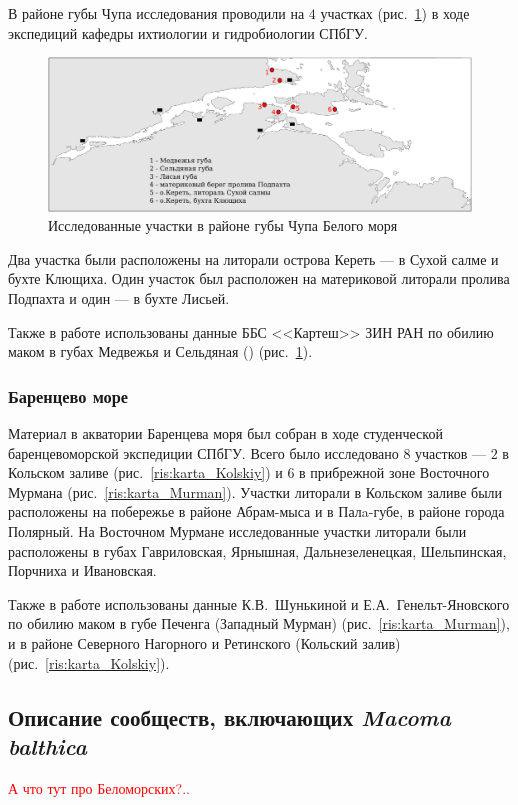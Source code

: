 В районе губы Чупа исследования проводили на $4$ участках (рис.~\ref{ris:karta_Chupa}) в ходе экспедиций кафедры ихтиологии и гидробиологии СПбГУ. 
\begin{figure}
    \includegraphics[width=\textwidth]{../maps/map_Chupa.pdf}
    \caption{Исследованные участки в районе губы Чупа Белого моря}
    \label{ris:karta_Chupa}
\end{figure}
Два участка были расположены на литорали острова Кереть --- в Сухой салме и бухте Клющиха. 
Один участок был расположен на материковой литорали пролива Подпахта и один --- в бухте Лисьей.

Также в работе использованы данные ББС <<Картеш>> ЗИН РАН по обилию маком в губах Медвежья и Сельдяная (\cite{Varfolomeeva_Naumov_2013}) (рис.~\ref{ris:karta_Chupa}).

		\subsubsection{Баренцево море}
Материал  в акватории Баренцева моря  был  собран    в ходе   студенческой баренцевоморской экспедиции СПбГУ. 
Всего было исследовано $8$ участков --- $2$ в Кольском заливе (рис.~\ref{ris:karta_Kolskiy})   и   $6$  в   прибрежной   зоне  Восточного  Мурмана (рис.~\ref{ris:karta_Murman}).  
Участки литорали  в   Кольском   заливе   были  расположены на побережье в районе Абрам-мыса и в Палa-губе, в районе города Полярный. 
На   Восточном   Мурмане исследованные участки литорали  были   расположены   в   губах   Гавриловская,  Ярнышная, Дальнезеленецкая, Шельпинская, Порчниха и Ивановская.

Также в работе использованы данные К.\:В.~Шунькиной и Е.\:А.~Генельт-Яновского по обилию маком в губе Печенга (Западный Мурман) (рис.~\ref{ris:karta_Murman}), и в районе Северного Нагорного и Ретинского (Кольский залив) (рис.~\ref{ris:karta_Kolskiy}).

    \subsection{Описание сообществ, включающих {\it Macoma balthica}}
\textcolor{red}{А что тут про Беломорских?..}


